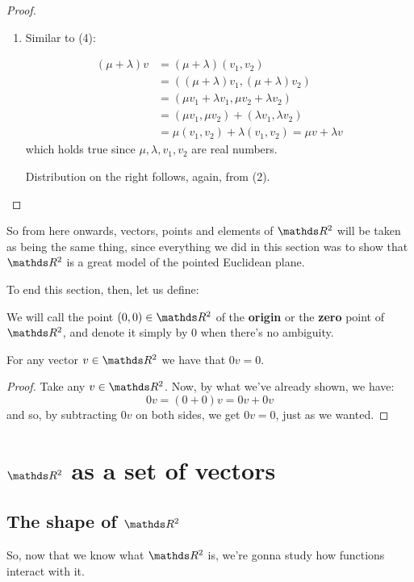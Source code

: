 \begin{proof}
\begin{enumerate}[(1)]
		\item Similar to (4):
		
		\begin{align*}
			(\mu+\lambda)v&=(\mu+\lambda)(v_1,v_2)\\
			&=((\mu+\lambda)v_1,(\mu+\lambda) v_2)\\
			&=(\mu v_1+\lambda v_1,\mu v_2+\lambda v_2)\\
			&=(\mu v_1,\mu v_2)+(\lambda v_1,\lambda v_2)\\
			&=\mu(v_1,v_2)+\lambda(v_1,v_2)=\mu v+\lambda v
		\end{align*}which holds true since $\mu,\lambda,v_1,v_2$ are real numbers.
		
		Distribution on the right follows, again, from (2).
	\end{enumerate}
\end{proof}

So from here onwards, vectors, points and elements of $\R^2$ will be taken as being the same thing, since everything we did in this section was to show that $\R^2$ is a great model of the pointed Euclidean plane.

To end this section, then, let us define:

\begin{df}
	We will call the point $(0,0)\in \R^2$ of the \textbf{origin} or the \textbf{zero} point of $\R^2$, and denote it simply by $0$ when there's no ambiguity.
\end{df}

\begin{prop}
	For any vector $v\in \R^2$ we have that $0v=0$.
\end{prop}
\begin{proof}
	Take any $v\in \R^2$. Now, by what we've already shown, we have:
	\[0v=(0+0)v=0v+0v\]and so, by subtracting $0v$ on both sides, we get $0v=0$, just as we wanted.
\end{proof}

\newpage
\section{$\R^2$ as a set of vectors}
\subsection{The shape of $\R^2$}

So, now that we know what $\R^2$ is, we're gonna study how functions interact with it.

